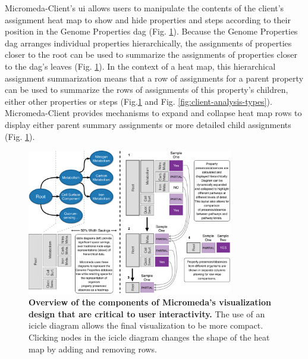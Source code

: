 Micromeda-Client's \gls{ui} allows users to manipulate the contents of the 
client's assignment heat map to show and hide properties and steps according to 
their position in the Genome Properties \gls{dag} \cite{richardson2018genome} 
(Fig. \ref{fig:visualization-philosophy}). Because the Genome Properties 
\gls{dag} arranges individual properties hierarchically, the assignments of 
properties closer to the root can be used to summarize the assignments of 
properties closer to the \gls{dag}'s leaves (Fig. 
\ref{fig:visualization-philosophy}). In the context of a heat map, this 
hierarchical assignment summarization means that a row of assignments for a 
parent property can be used to summarize the rows of assignments of this 
property's children, either other properties or steps 
(Fig.\ref{fig:visualization-philosophy} and Fig. 
\ref{fig:client-analysis-types}). Micromeda-Client provides mechanisms to expand 
and collapse heat map rows to display either parent summary assignments or more 
detailed child assignments (Fig. \ref{fig:visualization-philosophy}).

\begin{figure}[!ht]
  \centering
	\includegraphics[width=0.8\textwidth]{media/visualization_design_philosphy.pdf}
	 \caption[Overview of the components of Micromeda's visualization design that 
are critical to user interactivity.]{\textbf{Overview of the components of 
Micromeda's visualization design that are critical to user interactivity.} The 
use of an icicle diagram allows the final visualization to be more compact. 
Clicking nodes in the icicle diagram changes the shape of the heat map by adding 
and removing rows.}
	 \label{fig:visualization-philosophy}
\end{figure}

